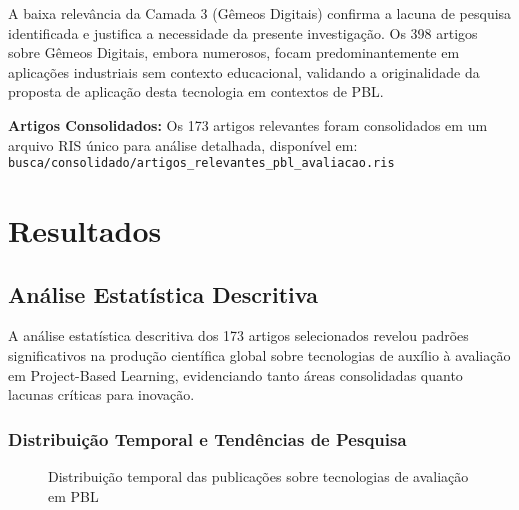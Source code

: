 \documentclass[english, spanish, brazilian]{RBIEarticle} %
\begin{document}
A baixa relevância da Camada 3 (Gêmeos Digitais) confirma a lacuna de pesquisa identificada e justifica a necessidade da presente investigação. Os 398 artigos sobre Gêmeos Digitais, embora numerosos, focam predominantemente em aplicações industriais sem contexto educacional, validando a originalidade da proposta de aplicação desta tecnologia em contextos de PBL.

\textbf{Artigos Consolidados:} Os 173 artigos relevantes foram consolidados em um arquivo RIS único para análise detalhada, disponível em: \texttt{busca/consolidado/artigos\_relevantes\_pbl\_avaliacao.ris}

\section{Resultados}

\subsection{Análise Estatística Descritiva}

A análise estatística descritiva dos 173 artigos selecionados revelou padrões significativos na produção científica global sobre tecnologias de auxílio à avaliação em Project-Based Learning, evidenciando tanto áreas consolidadas quanto lacunas críticas para inovação.

\subsubsection{Distribuição Temporal e Tendências de Pesquisa}

\begin{figure}[htbp]
\centering
{}
\caption{Distribuição temporal das publicações sobre tecnologias de avaliação em PBL}
\label{fig:temporal}
\end{figure}
\end{document}
